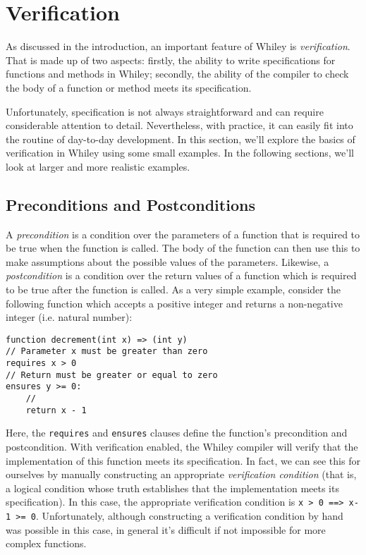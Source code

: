\newpage
\section{Verification}

As discussed in the introduction, an important feature of Whiley is
{\em verification}.  That is made up of two aspects: firstly, the
ability to write specifications for functions and methods in Whiley;
secondly, the ability of the compiler to check the body of a function
or method meets its specification.

Unfortunately, specification is not always straightforward and
can require considerable attention to detail.  Nevertheless, with
practice, it can easily fit into the routine of day-to-day
development.  In this section, we'll explore the basics of
verification in Whiley using some small examples.  In the following
sections, we'll look at larger and more realistic examples.

\subsection{Preconditions and Postconditions}
A {\em precondition} is a condition over the parameters of a function
that is required to be true when the function is called.  The body of
the function can then use this to make assumptions about the possible
values of the parameters.  Likewise, a {\em postcondition} is a
condition over the return values of a function which is required to be
true after the function is called.  As a very simple example, consider
the following function which accepts a positive integer and returns a
non-negative integer (i.e. natural number):
\begin{lstlisting}
function decrement(int x) => (int y) 
// Parameter x must be greater than zero
requires x > 0
// Return must be greater or equal to zero
ensures y >= 0:
    //
    return x - 1
\end{lstlisting}
Here, the \lstinline{requires} and \lstinline{ensures} clauses define
the function's precondition and postcondition.  With verification
enabled, the Whiley compiler will verify that the
implementation of this function meets its specification.  In fact, we
can see this for ourselves by manually constructing an appropriate
{\em verification condition} (that is, a logical condition whose truth
establishes that the implementation meets its specification).  In this
case, the appropriate verification condition is
 \lstinline{x > 0 ==> x-1 >= 0}.  Unfortunately, although constructing a verification
condition by hand was possible in this case, in general it's difficult
if not impossible for more complex functions.

